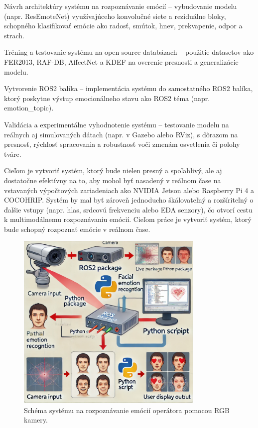 Návrh architektúry systému na rozpoznávanie emócií – vybudovanie modelu (napr. ResEmoteNet) využívajúceho konvolučné siete a reziduálne bloky, schopného klasifikovať emócie ako radosť, smútok, hnev, prekvapenie, 
odpor a strach​.

Tréning a testovanie systému na open-source databázach – použitie datasetov ako FER2013, RAF-DB, AffectNet a KDEF na overenie presnosti a generalizácie modelu​.

Vytvorenie ROS2 balíka – implementácia systému do samostatného ROS2 balíka, ktorý poskytne výstup emocionálneho stavu ako ROS2 téma (napr. emotion\_topic).

Validácia a experimentálne vyhodnotenie systému – testovanie modelu na reálnych aj simulovaných dátach (napr. v Gazebo alebo RViz), s dôrazom na presnosť, rýchlosť spracovania a robustnosť voči zmenám osvetlenia či polohy tváre.

Cieľom je vytvoriť systém, ktorý bude nielen presný a spoľahlivý, ale aj dostatočne efektívny na to, aby mohol byť nasadený v reálnom čase na vstavaných výpočtových zariadeniach ako 
NVIDIA Jetson alebo Raspberry Pi 4 a COCOHRIP. Systém by mal byť zároveň jednoducho škálovateľný a rozšíriteľný o ďalšie vstupy (napr. hlas, srdcovú frekvenciu alebo EDA senzory), čo otvorí cestu k multimodálnemu rozpoznávaniu emócií.
Cieľom práce je vytvoriť systém, ktorý bude schopný rozpoznať emócie v reálnom čase.\
\begin{figure}[!htpb]
    \centering
    \includegraphics[width=0.8\textwidth]{img/connection.png}
    \caption{Schéma systému na rozpoznávanie emócií operátora pomocou RGB kamery.} 
    \label{fig:schema}
\end{figure}
